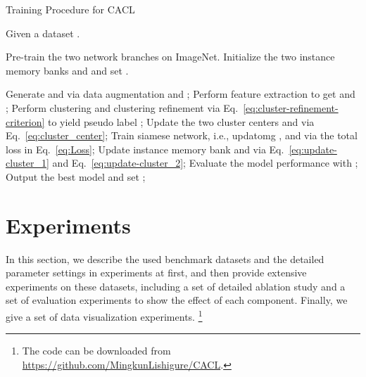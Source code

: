 \documentclass[journal]{IEEEtran}
\def\ie{i.e.}
\begin{document}
\begin{algorithm}[tb] 

		\caption{Training Procedure for CACL}
			\label{alg:Framwork}
		\begin{algorithmic}[1]
		\REQUIRE
		 Given a dataset . 

		\ENSURE
		\STATE Pre-train the two network branches on ImageNet.
		\STATE Initialize the two instance memory banks  and  and set  .
		
		\STATE Generate  and  via data augmentation  and ;
		\STATE Perform feature extraction to get  and ;
		\STATE Perform clustering and clustering refinement via Eq.~\eqref{eq:cluster-refinement-criterion} to yield pseudo label ; 
		\STATE Update the two cluster centers  and  via Eq.~\eqref{eq:cluster_center};
		\STATE Train siamese network, \ie, updatomg ,  and  via the total loss in Eq.~\eqref{eq:Loss};
		\STATE Update instance memory bank  and  via Eq.~\eqref{eq:update-cluster_1} and  Eq.~\eqref{eq:update-cluster_2};
		\STATE Evaluate the model performance  with ;
		\IF{ }	
			 \STATE Output the best model  and set ;
		\ENDIF		
		\ENDWHILE
		\end{algorithmic}

	\end{algorithm}	



\section{Experiments}
\label{sec:experiments}

In this section, we describe the used benchmark datasets and the detailed parameter settings in experiments at first, and then provide extensive experiments on these datasets, including a set of detailed ablation study and a set of evaluation experiments to show the effect of each component. Finally, we give a set of data visualization experiments. \footnote{The code can be downloaded from \url{https://github.com/MingkunLishigure/CACL}.}
\end{document}
